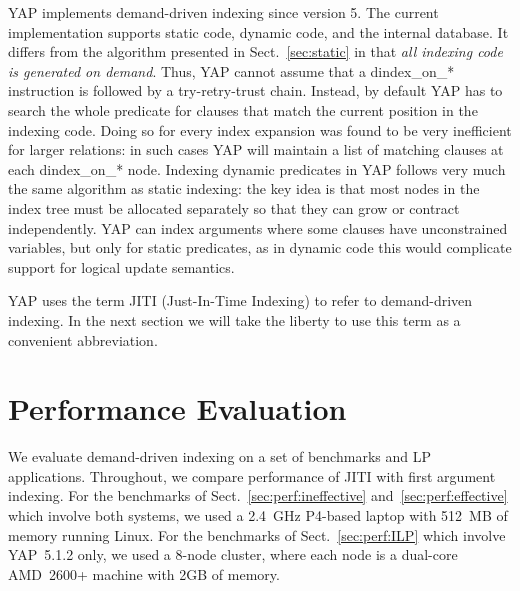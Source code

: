 \documentclass{llncs}
\newcommand{\instr}[1]{\textsf{#1}}
\newcommand{\TryRetryTrust}{\mbox{\instr{try-retry-trust}}\xspace}
\newcommand{\jitiSTAR}{\mbox{\instr{dindex\_on\_*}}\xspace}
\newcommand{\JITI}{demand-driven indexing\xspace}
\begin{document}
YAP implements \JITI since version 5. The current implementation
supports static code, dynamic code, and the internal database. It
differs from the algorithm presented in Sect.~\ref{sec:static} in that
\emph{all indexing code is generated on demand}. Thus, YAP cannot
assume that a \jitiSTAR instruction is followed by a \TryRetryTrust
chain. Instead, by default YAP has to search the whole predicate for
clauses that match the current position in the indexing code. Doing so
for every index expansion was found to be very inefficient for larger
relations: in such cases YAP will maintain a list of matching clauses
at each \jitiSTAR node. Indexing dynamic predicates in YAP follows
very much the same algorithm as static indexing: the key idea is that
most nodes in the index tree must be allocated separately so that they
can grow or contract independently. YAP can index arguments where some
clauses have unconstrained variables, but only for static predicates,
as in dynamic code this would complicate support for logical update
semantics.

YAP uses the term JITI (Just-In-Time Indexing) to refer to \JITI. In
the next section we will take the liberty to use this term as a
convenient abbreviation.

\section{Performance Evaluation} \label{sec:perf}
We evaluate \JITI on a set of benchmarks and LP applications.
Throughout, we compare performance of JITI with first argument
indexing. For the benchmarks of Sect.~\ref{sec:perf:ineffective}
and~\ref{sec:perf:effective} which involve both systems, we used a
2.4~GHz P4-based laptop with 512~MB of memory running Linux.
For the benchmarks of Sect.~\ref{sec:perf:ILP} which involve
YAP~5.1.2 only, we used a 8-node cluster, where each node is a
dual-core AMD~2600+ machine with 2GB of memory.
\end{document}
